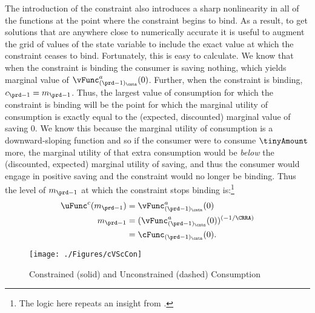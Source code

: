 
The introduction of the constraint also introduces a sharp
nonlinearity in all of the functions at the point where the constraint
begins to bind.  As a result, to get solutions that are anywhere close
to numerically accurate it is useful to augment the grid of values of
the state variable to include the exact value at which the constraint
ceases to bind.  Fortunately, this is easy to calculate.  We know that
when the constraint is binding the consumer is saving nothing, which
yields marginal value of $\vFunc^{a}_{({\prd-1})_\cntn}(0)$. Further, when the
constraint is binding, $c_{\prd-1} = m_{\prd-1}$.  Thus, the largest
value of consumption for which the constraint is binding will be the
point for which the marginal utility of consumption is exactly equal
to the (expected, discounted) marginal value of saving 0.  We know
this because the marginal utility of consumption is a downward-sloping
function and so if the consumer were to consume $\tinyAmount$ more,
the marginal utility of that extra consumption would be \textit{below}
the (discounted, expected) marginal utility of saving, and thus the
consumer would engage in positive saving and the constraint would no
longer be binding.  Thus the level of $m_{\prd-1}$ at which the
constraint stops binding is:\footnote{The logic here repeats an insight from \cite{deatonLiqConstr}.}
\begin{equation}\begin{gathered}\begin{aligned}
      \uFunc^{c}(m_{\prd-1})  & = \vFunc^{a}_{({\prd-1})_\cntn}(0)  \nonumber \\
      m_{\prd-1}  & = (\vFunc^{a}_{({\prd-1})_\cntn}(0))^{(-1/\CRRA)}  \nonumber
      \\        & = \cFunc_{({\prd-1})_\cntn}(0). \label{eq:LCbindsTm1}
    \end{aligned}\end{gathered}\end{equation}

\hypertarget{cVScCon}{}
\begin{figure}
  \texttt{[image: ./Figures/cVScCon]}
  \caption{Constrained (solid) and Unconstrained (dashed) Consumption}
  \label{fig:cVScCon}
\end{figure}

